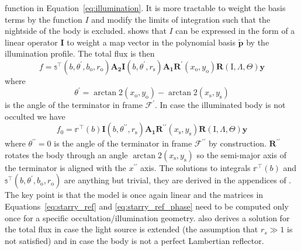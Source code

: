 \documentclass[12pt]{report}
\begin{document}
function in Equation~\ref{eq:illumination}. It is more tractable to weight the basis
terms by the function $I$ and modify the limits of integration such that the nightside
of the body is excluded. \citet{2021arXiv210306275L} shows that $I$ can be expressed
in the form of a linear operator $\mathbf{I}$ to weight a map vector  in the polynomial
basis $\tilde{\mathbf{p}}$ by the illumination profile. The total flux is then
\begin{equation}
    f=\mathbb{s}^\top\left(b, \theta^{\prime}, b_{\mathrm{o}}, r_{\mathrm{o}}\right) \mathbf{A}_{\mathbf{2}} \mathbf{I}\left(b, \theta^{\prime}, r_{\mathrm{s}}\right) \mathbf{A}_{\mathbf{1}} \mathbf{R}^{\prime}\left(x_{\mathrm{o}}, y_{\mathrm{o}}\right) \mathbf{R}(\mathrm{I}, \Lambda, \Theta) \mathbf{y}
\end{equation}
where
\begin{equation}
    \theta^{\prime}=\arctan 2\left(x_{\mathrm{o}}, y_{\mathrm{o}}\right)-\arctan 2\left(x_{\mathrm{s}}, y_{\mathrm{s}}\right)
    \label{eq:starry_ref}
\end{equation}
is the angle of the terminator in frame $\mathcal{F}^\prime$.
In case the illuminated body is not occulted we have
\begin{equation}
    f_{0}=\mathbb{r}^{\top}(b) \mathbf{I}\left(b, \theta^{\prime \prime}, r_{\mathrm{s}}\right) \mathbf{A}_{\mathbf{1}} \mathbf{R}^{\prime \prime}\left(x_{\mathrm{s}}, y_{\mathrm{s}}\right) \mathbf{R}(\mathrm{I}, \Lambda, \Theta) \mathbf{y}
    \label{eq:starry_ref_phase}
\end{equation}
where $\theta^{\prime\prime}=0$ is the angle of the terminator in frame
$\mathcal{F}^{\prime\prime}$ by construction. $\mathbf{R}^{\prime\prime}$ rotates the
body through an angle $\arctan 2\left(x_{\mathrm{s}}, y_{\mathrm{s}}\right)$ so the
semi-major axis of the terminator is aligned with the $x^{\prime \prime}$ axis.
The solutions to integrals
$\mathbb{r}^{\top}(b)$ and $\mathbb{s}^{\top}\left(b, \theta^{\prime}, b_{\mathrm{o}}, r_{\mathrm{o}}\right)$
are anything but trivial, they are derived in the appendices of
\citet{2021arXiv210306275L}. The key point is that the model is once again linear and
the matrices in Equations~\ref{eq:starry_ref} and \ref{eq:starry_ref_phase} need to be
computed only once for a specific occultation/illumination geometry.
\citet{2021arXiv210306275L} also derives a solution for the total flux in case the
light source is extended (the assumption that $r_s\gg 1$ is not satisfied) and
in case the body is not a perfect Lambertian reflector.
\end{document}

